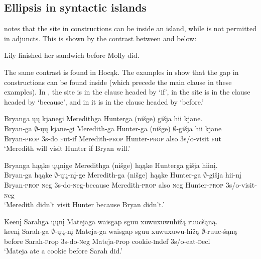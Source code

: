 \documentclass[output=paper]{LSP/langsci}
\begin{document}
\subsection{Ellipsis in syntactic islands}\label{sec:johnson:3.3}

\citet{Goldberg2005} notes that the  site in  constructions can be inside an  island, while  is not permitted in adjuncts. This is shown by the contrast between  and  below:
 
\ea
\ea\label{ex:johnson:34a} 
Lily finished her sandwich before Molly did.
\label{ex:johnson:34b}
\z
\z

The same contrast is found in Hocąk. The examples in  show that the gap in  constructions can be found inside   (which precede the main clause in these examples). In , the  site is in the clause headed by `if', in  the  site is in the clause headed by `because', and in  it is in the clause headed by `before.'
 
\ea\label{ex:johnson:35}
\ea\label{ex:johnson:35a} 
\glll Bryanga ųų kjanegi Meredithga Hunterga (nišge) {gišja hii} kjane.\\
Bryan-ga $\emptyset$-ųų kjane-gi Meredith-ga Hunter-ga (nišge) $\emptyset$-{gišja hii} kjane\\
Bryan-\textsc{prop} {\textsc 3s}-do {\textsc fut}-if Meredith-\textsc{prop} Hunter-\textsc{prop} also {\textsc 3s/o}-visit {\textsc fut}\\
\trans `Meredith will visit Hunter if Bryan will.'
 
\ex\label{ex:johnson:35b} 
\glll Bryanga hąąke ųųnįge Meredithga (nišge) hąąke Hunterga {gišja hiinį}.\\
Bryan-ga hąąke $\emptyset$-ųų-nį-ge Meredith-ga (nišge) hąąke Hunter-ga $\emptyset$-{gišja hii-nį}\\
Bryan-\textsc{prop} {\textsc neg} {\textsc 3s}-do-{\textsc neg}-because Meredith-\textsc{prop} also {\textsc neg} Hunter-\textsc{prop} {\textsc 3s/o}-visit-{\textsc neg}\\
\trans `Meredith didn't visit Hunter because Bryan didn't.'
 
\ex\label{ex:johnson:35c} 
\glll Keenį Sarahga ųųnį Matejaga {waisgap sguu xuwuxuwuhižą} ruucšąną.\\
keenį Sarah-ga $\emptyset$-ųų-nį Mateja-ga {waisgap sguu xuwuxuwu-hižą} $\emptyset$-ruuc-šąną\\
before Sarah-{\textsc prop} {\textsc 3s}-do-{\textsc neg} Mateja-{\textsc prop} cookie-{\textsc indef} {\textsc 3s/o}-eat-{\textsc decl}\\
\trans `Mateja ate a cookie before Sarah did.'
\z
\z
\end{document}
